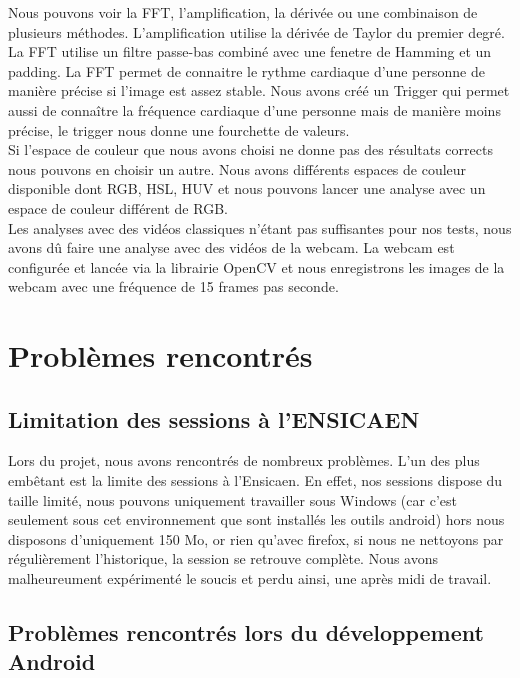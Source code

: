 	Nous pouvons voir la FFT, l'amplification, la dérivée ou une combinaison de plusieurs méthodes.
	L'amplification utilise la dérivée de Taylor du premier degré.
	La FFT utilise un filtre passe-bas combiné avec une fenetre de Hamming et un padding.
	La FFT permet de connaitre le rythme cardiaque d'une personne de manière précise si l'image est assez stable.
	Nous avons créé un Trigger qui permet aussi de connaître la fréquence cardiaque d'une personne mais de manière moins précise, le trigger nous donne une fourchette de valeurs.\\

	Si l'espace de couleur que nous avons choisi ne donne pas des résultats corrects nous pouvons en choisir un autre.
	Nous avons différents espaces de couleur disponible dont RGB, HSL, HUV et nous pouvons lancer une analyse avec un espace de couleur différent de RGB.\\

	Les analyses avec des vidéos classiques n'étant pas suffisantes pour nos tests, nous avons dû faire une analyse avec des vidéos de la webcam.
	La webcam est configurée et lancée via la librairie OpenCV et nous enregistrons les images de la webcam avec une fréquence de 15 frames pas seconde.\\

\section{Problèmes rencontrés}

\subsection{Limitation des sessions à l'ENSICAEN}

Lors du projet, nous avons rencontrés de nombreux problèmes. L'un des plus embêtant est la limite des sessions à l'Ensicaen. En effet, nos sessions dispose du taille limité, nous pouvons uniquement travailler sous Windows (car
c'est seulement sous cet environnement que sont installés les outils android) hors nous disposons d'uniquement 150 Mo, or rien qu'avec firefox, si nous ne nettoyons par régulièrement l'historique, la session se retrouve 
complète. Nous avons malheureument expérimenté le soucis et perdu ainsi, une après midi de travail. 

\subsection{Problèmes rencontrés lors du développement Android}

